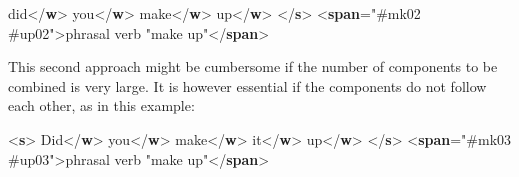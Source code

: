 \begin{shaded}
did{</\textbf{w}>}\mbox{}\newline 
{}you{</\textbf{w}>}\mbox{}\newline 
{}make{</\textbf{w}>}\mbox{}\newline 
{}up{</\textbf{w}>}\mbox{}\newline 
{</\textbf{s}>}\mbox{}\newline 
{<\textbf{span}\hspace*{1em}{target}="{\#mk02 \#up02}">}phrasal verb "make up"{</\textbf{span}>}\end{shaded}\egroup\par \noindent  This second approach might be cumbersome if the number of components to be combined is very large. It is however essential if the components do not follow each other, as in this example: \par\bgroup{}\exampleFont \begin{shaded}\noindent\mbox{}{<\textbf{s}>}\mbox{}\newline 
{}Did{</\textbf{w}>}\mbox{}\newline 
{}you{</\textbf{w}>}\mbox{}\newline 
{}make{</\textbf{w}>}\mbox{}\newline 
{}it{</\textbf{w}>}\mbox{}\newline 
{}up{</\textbf{w}>}\mbox{}\newline 
{</\textbf{s}>}\mbox{}\newline 
{<\textbf{span}\hspace*{1em}{target}="{\#mk03 \#up03}">}phrasal verb "make up"{</\textbf{span}>}\end{shaded}\egroup\par \par
